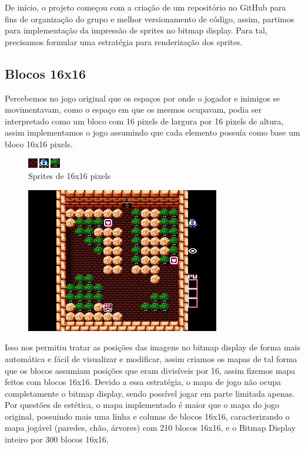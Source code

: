 \documentclass[10pt, conference, compsocconf]{IEEEtran}
\begin{document}
De início, o projeto começou com a criação de um repositório no GitHub para fins
de organização do grupo e melhor versionamento de código, assim, partimos para
implementação da impressão de sprites no bitmap display. Para tal, precisamos
formular uma estratégia para renderização dos sprites.

\subsection{Blocos 16x16}{
\label{sec:MIPS}

Percebemos no jogo original que os espaços por onde
o jogador e inimigos se movimentavam, como o espaço
em que os mesmos ocupavam, podia ser interpretado
como um bloco com 16 pixels de largura por 16 pixels de altura, assim implementamos o jogo assumindo
que cada elemento possuía como base um bloco 16x16
pixels.

}

\begin{figure}[htb]
  \begin{center}
   \includegraphics[width=0.7\linewidth]{./Figures/image_2e3e4.png}
  \end{center}
  \caption{Sprites de 16x16 pixels}
  \label{fig:02}
\end{figure}

\begin{figure}[htb]
  \begin{center}
   \includegraphics[width=0.3\linewidth]{./Figures/image_5.png}
  \end{center}
  \label{fig:01}
\end{figure}

Isso nos permitiu tratar as posições das imagens no bitmap display de forma mais
automática e fácil de visualizar e modificar, assim criamos os mapas de tal
forma que os blocos assumiam posições que eram divisíveis por 16, assim fizemos
mapa feitos com blocos 16x16. Devido a essa estratégia, o mapa de jogo não ocupa
completamente o bitmap display, sendo possível jogar em parte limitada apenas.
Por questões de estética, o mapa implementado é maior que o mapa do jogo
original, possuindo mais uma linha e colunas de blocos 16x16, caracterizando o
mapa jogável (paredes, chão, árvores) com 210 blocos 16x16, e o Bitmap Display
inteiro por 300 blocos 16x16.
\end{document}
